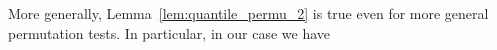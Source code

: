 \documentclass{article}
\theoremstyle{plain}
\newtheorem{Theorem}{Theorem}
\theoremstyle{remark}
\renewcommand{\P}{\mathbb{P}}
\newcommand{\R}{\mathbb{R}}
\newcommand{\1}{\mathbbm{1}}
\numberwithin{equation}{section}
\begin{document}
More generally, Lemma~\ref{lem:quantile_permu_2} is true even for more general permutation tests. In particular, in our case we have
\end{document}

